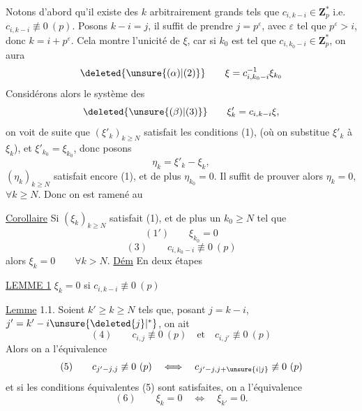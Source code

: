 Notons d'abord qu'il existe des $k$ arbitrairement grands tels que $c_{i,k-i}\in\mathbf Z_p^*$ i.e. $c_{i,k-i}\not\equiv0\ (p)$. Posons $k-i=j$, il suffit de prendre $j=p^\varepsilon$, avec $\varepsilon$ tel que $p^\varepsilon>i$, donc $k=i+p^\varepsilon$. Cela montre l'unicité de $\xi$, car si $k_0$ est tel que $c_{i,k_0-i}\in\mathbf Z_p^*$, on aura
\[
\deleted{\unsure{(\alpha)|(2)}}\qquad\xi=c_{i,k_0-i}^{-1}\xi_{k_0}
\]
Considérons alors le système des
\[
\deleted{\unsure{(\beta)|(3)}}\qquad\xi'_k=c_{i,k-i}\xi,
\]
on voit de suite  que  $(\xi'_k)_{k\geq N}$ satisfait les conditions (1), (où on substitue $\xi'_k$ à $\xi_k$), et $\xi'_{k_0}=\xi_{k_0}$, donc posons
\[
\eta_k=\xi'_k-\xi_k,
\]
 $(\eta_k)_{k\geq N}$ satisfait encore (1), et de plus $\eta_{k_0}=0$. Il suffit de prouver alors $\eta_k=0$,  $\forall k\geq N$. Donc on est ramené au

\uline{Corollaire} Si $(\xi_k)_{k\geq N}$  satisfait (1), et  de plus   un $k_0\geq N$ tel que
\[
(1')\qquad\xi_{k_0}=0
\]
\[
(3)\qquad c_{i,k_0-i}\not\equiv0\ (p)
\]
alors $\xi_k=0\qquad\forall k>N$.
\uline{Dém} En deux étapes

\uline{LEMME 1} $\xi_k=0$ si  $c_{i,k-i}\not\equiv0\ (p)$

\uline{Lemme} 1.1. Soient  $k'\geq k\geq N$ tels que, posant $j=k-i$, $j'=k'-i\unsure{\deleted{j}|^\ast}$, on ait
\[
(4)\qquad c_{i,j}\not\equiv0\ (p)\quad\text{et}\quad c_{i,j'}\not\equiv0\ (p)
\]
Alors on a l'équivalence
\[
(5)\qquad c_{j'-j,j}\not\equiv0\ (p)\quad\Longleftrightarrow\quad c_{j'-j,j+\unsure{i|j}}\not\equiv0\ (p)
\]
et si les conditions équivalentes (5) sont satisfaites, on a l'équivalence
\[
(6)\qquad\xi_k=0\quad\Longleftrightarrow\quad\xi_{k'}=0.
\]

